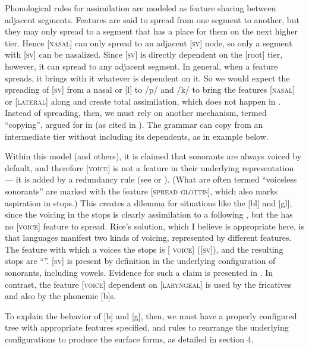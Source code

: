 \documentclass[output=paper]{LSP/langsci}
\begin{document}
Phonological rules for assimilation are modeled as feature sharing between adjacent segments. Features are said to spread from one segment to another, but they may only spread to a segment that has a place for them on the next higher tier. Hence [\textsc{nasal}] can only spread to an adjacent [\textsc{sv}] node, so only a segment with [\textsc{sv}] can be nasalized. Since [\textsc{sv}] is directly dependent on the [root] tier, however, it can spread to any adjacent segment. In general, when a feature spreads, it brings with it whatever is dependent on it. So we would expect the spreading of [\textsc{sv}] from a nasal or [l] to /p/ and /k/ to bring the features [\textsc{nasal}] or [\textsc{lateral}] along and create total assimilation, which does not happen in . Instead of spreading, then, we must rely on another mechanism, termed ``copying'', argued for in \citet{RiceAvery1991} (as cited in \citealt[316]{Rice1993}). The grammar can copy from an intermediate tier without including its dependents, as in example  below.

Within this model (and others), it is claimed that sonorants are always voiced by default, and therefore [\textsc{voice}] is not a feature in their underlying representation --- it is added by a redundancy rule (see \citealt[175, 177]{Botma2011} or \citealt[105]{Szigetvari2008}). (What are often termed ``voiceless sonorants'' are marked with the feature [\textsc{spread glottis}], which also marks aspiration in stops.) This creates a dilemma for situations like the  [bl] and [gl], since the voicing in the stops is clearly assimilation to a following , but the  has no [\textsc{voice}] feature to spread. Rice's solution, which I believe is appropriate here, is that languages manifest two kinds of voicing, represented by different features. The feature with which a  voices the  stops is [\textsc{ voice}] ([\textsc{sv}]), and the resulting stops are ``''. [\textsc{sv}] is present by definition in the underlying configuration of sonorants, including vowels. Evidence for such a claim is presented in \citet{Rice1993,Rice2013}. In contrast, the feature [\textsc{voice}] dependent on [\textsc{laryngeal}] is used by the fricatives and also by the phonemic [b]s.

To explain the behavior of [b] and [g], then, we must have a properly configured tree with appropriate features specified, and rules to rearrange the underlying configurations to produce the surface forms, as detailed in section 4.
\end{document}
